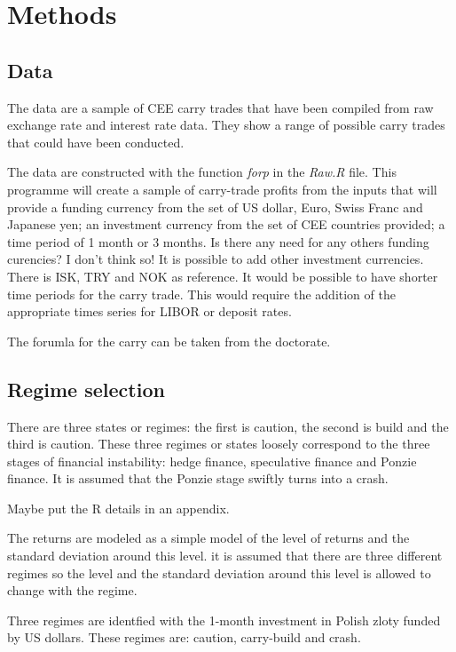 \documentclass[12pt, a4paper, oneside]{article} %
\begin{document}
\section{Methods}
\subsection{Data}
The data are a sample of CEE carry trades that have been compiled from raw exchange rate and interest rate data.  They show a range of possible carry trades that could have been conducted. 

The data are constructed with the function \emph{forp} in the \emph{Raw.R} file. This programme will create a sample of carry-trade profits from the inputs that will provide a funding currency from the set of US dollar, Euro, Swiss Franc and Japanese yen; an investment currency from the set of CEE countries provided; a time period of 1 month or 3 months.  Is there any need for any others funding curencies?  I don't think so!   It is possible to add other investment currencies.  There is ISK, TRY and NOK as reference.  It would be possible to have shorter time periods for the carry trade.   This would require the addition of the appropriate times series for LIBOR or deposit rates.  

The forumla for the carry can be taken from the doctorate. 

\subsection{Regime selection}
There are three states or regimes: the first is caution, the second is build and the third is caution. These three regimes or states loosely correspond to the three stages of financial instability: hedge finance, speculative finance and Ponzie finance. It is assumed that the Ponzie stage swiftly turns into a crash. 

Maybe put the R details in an appendix. 

The returns are modeled as a simple model of the level of returns and the standard deviation around this level.  it is assumed that there are three different regimes so the level and the standard deviation around this level is allowed to change with the regime.  

Three regimes are identfied with the 1-month investment in Polish zloty funded by US dollars.  These regimes are:  caution, carry-build and crash. 
\end{document}
